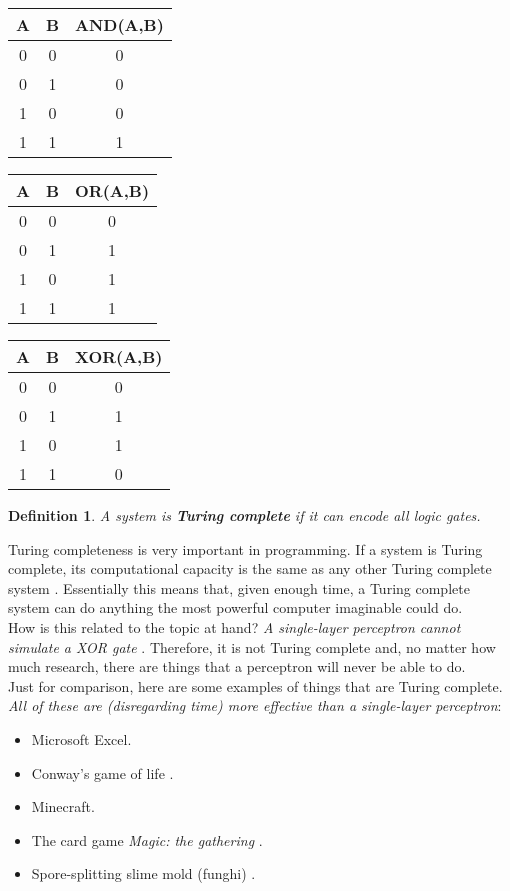 \documentclass[titlepage]{article}
\theoremstyle{plain}
\newtheorem{definition}{Definition}[section]
\theoremstyle{definition}
\begin{document}
		\begin{center}
			\begin{tabular}{|c c | c|} 
				\hline
				A & B & AND(A,B)\\ [0.5ex] 
				\hline\hline
				0 & 0 & 0 \\ 
				\hline
				0 & 1 & 0 \\
				\hline
				1 & 0 & 0 \\
				\hline
				1 & 1 & 1 \\ [1ex] 
				\hline
			\end{tabular}\quad
			\begin{tabular}{|c c | c|} 
				\hline
				A & B & OR(A,B)\\ [0.5ex] 
				\hline\hline
				0 & 0 & 0 \\ 
				\hline
				0 & 1 & 1 \\
				\hline
				1 & 0 & 1 \\
				\hline
				1 & 1 & 1 \\ [1ex] 
				\hline
			\end{tabular}\quad
			\begin{tabular}{|c c | c|} 
				\hline
				A & B & XOR(A,B)\\ [0.5ex] 
				\hline\hline
				0 & 0 & 0 \\ 
				\hline
				0 & 1 & 1 \\
				\hline
				1 & 0 & 1 \\
				\hline
				1 & 1 & 0 \\ [1ex] 
				\hline
			\end{tabular}
		\end{center}
		\begin{definition}
			A system is \textbf{Turing complete} if it can encode all logic gates.
		\end{definition}
		Turing completeness is very important in programming. If a system is Turing complete, its computational capacity is the same as any other Turing complete system \cite{Millican}. Essentially this means that, given enough time, a Turing complete system can do anything  the most powerful computer imaginable could do.\\
		
		How is this related to the topic at hand? \textit{A single-layer perceptron cannot simulate a XOR gate} \cite{Yanling}. Therefore, it is not Turing complete and, no matter how much research, there are things that a perceptron will never be able to do.\\
		
		Just for comparison, here are some examples of things that are Turing complete. \textit{All of these are (disregarding time) more effective than a single-layer perceptron}:
		\begin{itemize}
			\item Microsoft Excel.
			\item Conway's game of life \cite{Conway}.
			\item Minecraft.
			\item The card game \textit{Magic: the gathering} \cite{Churchill}.
			\item Spore-splitting slime mold (funghi) \cite{TuringSlime}.
		\end{itemize}
		
\end{document}
